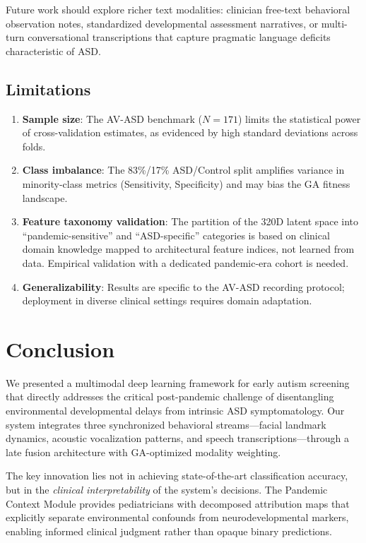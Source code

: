 \documentclass[conference]{IEEEtran}
\begin{document}
Future work should explore richer text modalities: clinician free-text behavioral observation notes, standardized developmental assessment narratives, or multi-turn conversational transcriptions that capture pragmatic language deficits characteristic of ASD.

\subsection{Limitations}

\begin{enumerate}
    \item \textbf{Sample size}: The AV-ASD benchmark ($N=171$) limits the statistical power of cross-validation estimates, as evidenced by high standard deviations across folds.
    \item \textbf{Class imbalance}: The 83\%/17\% ASD/Control split amplifies variance in minority-class metrics (Sensitivity, Specificity) and may bias the GA fitness landscape.
    \item \textbf{Feature taxonomy validation}: The partition of the 320D latent space into ``pandemic-sensitive'' and ``ASD-specific'' categories is based on clinical domain knowledge mapped to architectural feature indices, not learned from data. Empirical validation with a dedicated pandemic-era cohort is needed.
    \item \textbf{Generalizability}: Results are specific to the AV-ASD recording protocol; deployment in diverse clinical settings requires domain adaptation.
\end{enumerate}

\section{Conclusion}
\label{sec:conclusion}

We presented a multimodal deep learning framework for early autism screening that directly addresses the critical post-pandemic challenge of disentangling environmental developmental delays from intrinsic ASD symptomatology. Our system integrates three synchronized behavioral streams---facial landmark dynamics, acoustic vocalization patterns, and speech transcriptions---through a late fusion architecture with GA-optimized modality weighting.

The key innovation lies not in achieving state-of-the-art classification accuracy, but in the \textit{clinical interpretability} of the system's decisions. The Pandemic Context Module provides pediatricians with decomposed attribution maps that explicitly separate environmental confounds from neurodevelopmental markers, enabling informed clinical judgment rather than opaque binary predictions.
\end{document}
